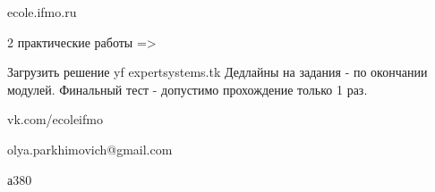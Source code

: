 \documentclass[a4paper,12pt]{report}
\begin{document}
	\def \nocredits {}
	\def \LineE {Конспект по дисциплине}
	\def \LineF {Защита и обработка конфиденциальных данных}

	\maketitle



ecole.ifmo.ru

2 практические работы =>

Загрузить решение yf expertsystems.tk
Дедлайны на задания  - по окончании модулей.
Финальный тест - допустимо прохождение только 1 раз.

vk.com/ecoleifmo

olya.parkhimovich@gmail.com

а380
\end{document}
